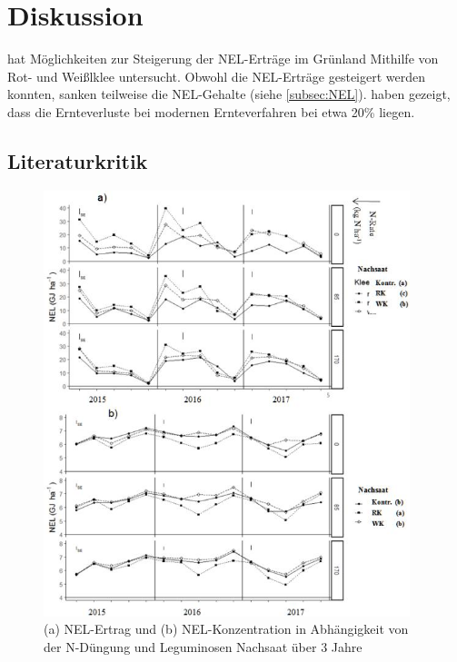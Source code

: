 
\section{Diskussion}
\label{sec:Disukussion}
\textcite[33-36]{weggler2050leguminosen} hat Möglichkeiten zur Steigerung der \ac{NEL}-Erträge im Grünland Mithilfe von Rot- und Weißlklee untersucht.
Obwohl die \ac{NEL}-Erträge gesteigert werden konnten, sanken teilweise die \ac{NEL}-Gehalte (siehe \cref{subsec:NEL}).
\textcite{fritz2018wirtschaftliche} haben gezeigt, dass die Ernteverluste bei modernen Ernteverfahren bei etwa 20\% liegen.


\subsection{Literaturkritik}
\label{sub:kritik}

\begin{figure}
	\centering
	\includegraphics[width=0.95\textwidth]{images/wegglerAbb1}
	\caption[(a) \acs{NEL}-Ertrag und (b) \acs{NEL}-Konzentration in Abhängigkeit von der N-Düngung und Leguminosen Nachsaat über 3 Jahre]{(a) \ac{NEL}-Ertrag und (b) \ac{NEL}-Konzentration in Abhängigkeit von der N-Düngung und Leguminosen Nachsaat über 3 Jahre \parencite[35]{weggler2050leguminosen}}
	\label{fig:wegglerAbb1}
\end{figure}



